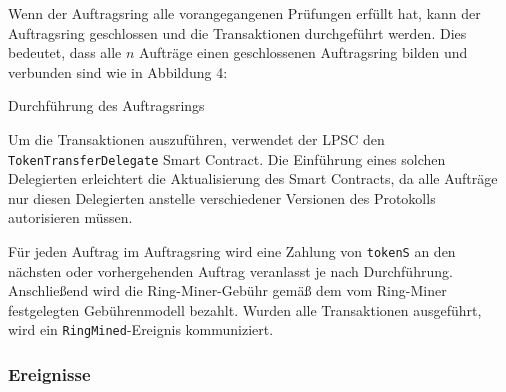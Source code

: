 \documentclass[UTF8,nofonts]{article}
\makeatletter
\newenvironment{figurehere}
 {\def\@captype{figure}}
 {}
\makeatother
\begin{document}
\begin{multicols}{2}
Wenn der Auftragsring alle vorangegangenen Prüfungen erfüllt hat, kann der Auftragsring geschlossen und die Transaktionen durchgeführt werden. Dies bedeutet, dass alle $n$ Aufträge einen geschlossenen Auftragsring bilden und verbunden sind wie in Abbildung 4:

\begin{center}
\begin{figurehere}
\centering
{}
\caption{Durchführung des Auftragsrings}
\label{fig:settlement}
\end{figurehere}
\end{center}

Um die Transaktionen auszuführen, verwendet der LPSC den \verb|TokenTransferDelegate| Smart Contract. Die Einführung eines solchen Delegierten erleichtert die Aktualisierung des Smart Contracts, da alle Aufträge nur diesen Delegierten anstelle verschiedener Versionen des Protokolls autorisieren müssen.

Für jeden Auftrag im Auftragsring wird eine Zahlung von \verb|tokenS| an den nächsten oder vorhergehenden Auftrag veranlasst je nach Durchführung. Anschließend wird die Ring-Miner-Gebühr gemäß dem vom Ring-Miner festgelegten Gebührenmodell bezahlt. Wurden alle Transaktionen ausgeführt, wird ein \verb|RingMined|-Ereignis kommuniziert.

\subsubsection{Ereignisse\label{sec:events}}


\end{multicols}
\end{document}

